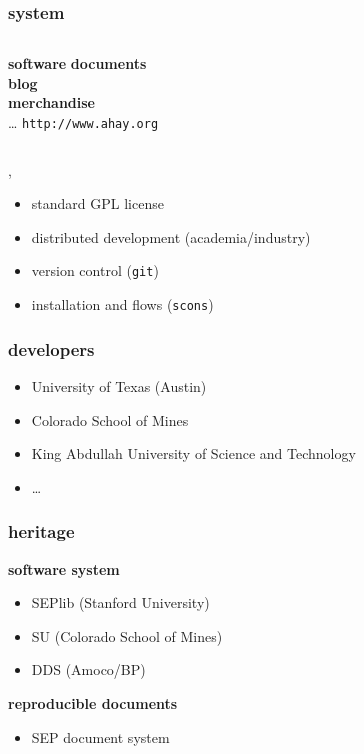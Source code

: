 \begin{frame} \frametitle{\mg system}

  \begin{columns}
    \textbf{software}
    \textbf{documents} \\
    \textbf{blog} \\
    \textbf{merchandise} \\
    \dots  
    \alert{ \texttt{http://www.ahay.org} }
  \end{columns}
  
  \sep
  
  \begin{itemize}
  \item standard GPL license
  \item distributed development (academia/industry)
  \item version control (\texttt{git})
  \item installation and flows (\texttt{scons})
  \end{itemize}
  
\end{frame}
\cwpnote{}


\begin{frame} \frametitle{\mg developers}

  \begin{itemize}
  \item University of Texas (Austin)
  \item Colorado School of Mines
  \item King Abdullah University of Science and Technology
  \item \dots
  \end{itemize}
  
\end{frame}
\cwpnote{}


\begin{frame} \frametitle{\mg heritage}

  \textbf{software system}
  \begin{itemize}
  \item SEPlib (Stanford University)
  \item SU (Colorado School of Mines)
  \item DDS (Amoco/BP)
  \end{itemize}
  
  \vfill
  
  \textbf{reproducible documents}
  \begin{itemize}
  \item SEP document system
  \end{itemize}

\end{frame}
\cwpnote{}

